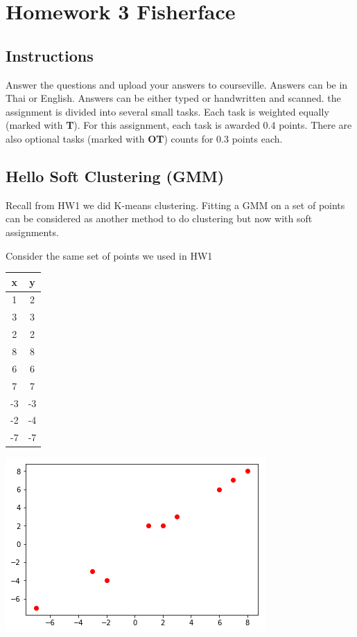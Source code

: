 \documentclass{article}
\newcounter{question}
\begin{document}
\section*{Homework 3 Fisherface}

\subsection*{Instructions} %
Answer the questions and upload your answers to courseville. Answers can be in Thai or English. Answers can be either typed or handwritten and scanned. the assignment is divided into several small tasks. Each task is weighted equally (marked with \textbf{T}). For this assignment, each task is awarded 0.4 points. There are also optional tasks (marked with \textbf{OT}) counts for 0.3 points each.

\subsection*{Hello Soft Clustering (GMM)}

Recall from HW1 we did K-means clustering. Fitting a GMM on a set of points can be considered as another method to do clustering but now with soft assignments. 

Consider the same set of points we used in HW1

\begin{center}
\begin{tabular}{ |c|c| } 
 \hline
 x & y \\
 \hline
 1 & 2 \\
 3 & 3 \\
 2 & 2 \\
 8 & 8 \\
 6 & 6 \\
 7 & 7 \\
 -3 & -3 \\
 -2 & -4 \\
 -7 & -7 \\
 \hline
\end{tabular}
\end{center}

\includegraphics[scale=0.5]{data.png}
\end{document}
